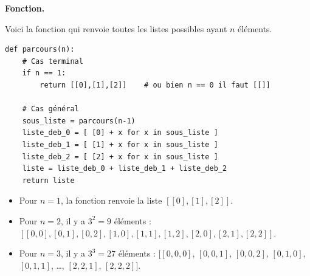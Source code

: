 \documentclass[11pt,class=report,crop=false]{standalone}
\begin{document}
\begin{cours}
\begin{itemize}
\smallskip

\end{itemize}

\textbf{Fonction.}

Voici la fonction  qui renvoie toutes les listes possibles ayant $n$ éléments.

\begin{lstlisting}
def parcours(n):
    # Cas terminal
    if n == 1:
        return [[0],[1],[2]]    # ou bien n == 0 il faut [[]]

    # Cas général
    sous_liste = parcours(n-1)  
    liste_deb_0 = [ [0] + x for x in sous_liste ]
    liste_deb_1 = [ [1] + x for x in sous_liste ]
    liste_deb_2 = [ [2] + x for x in sous_liste ]
    liste = liste_deb_0 + liste_deb_1 + liste_deb_2
    return liste
\end{lstlisting}


\begin{itemize}
  \item Pour $n=1$, la fonction renvoie la liste $[[0], [1], [2]]$.
  \item Pour $n=2$, il y a $3^2=9$ éléments : $[[0, 0], [0, 1], [0, 2], [1, 0], [1, 1], [1, 2], [2, 0], [2, 1], [2, 2]]$.
  \item Pour $n=3$, il y a $3^3=27$ éléments : $[[0, 0, 0]$, $[0, 0, 1]$, $[0, 0, 2]$, $[0, 1, 0]$, $[0, 1, 1]$, \ldots, $[2, 2, 1]$, $[2, 2, 2]]$.
\end{itemize}

\end{cours}


\end{document}
